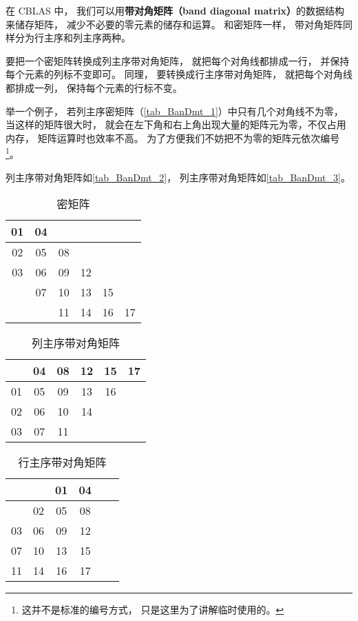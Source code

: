 

在 CBLAS 中， 我们可以用\textbf{带对角矩阵（band diagonal matrix）}的数据结构来储存矩阵， 减少不必要的零元素的储存和运算。 和密矩阵一样， 带对角矩阵同样分为行主序和列主序两种。

要把一个密矩阵转换成列主序带对角矩阵， 就把每个对角线都排成一行， 并保持每个元素的列标不变即可。 同理， 要转换成行主序带对角矩阵， 就把每个对角线都排成一列， 保持每个元素的行标不变。

举一个例子， 若列主序密矩阵（\autoref{tab_BanDmt_1}）中只有几个对角线不为零， 当这样的矩阵很大时， 就会在左下角和右上角出现大量的矩阵元为零，不仅占用内存， 矩阵运算时也效率不高。 为了方便我们不妨把不为零的矩阵元依次编号\footnote{这并不是标准的编号方式， 只是这里为了讲解临时使用的。}。

列主序带对角矩阵如\autoref{tab_BanDmt_2}， 列主序带对角矩阵如\autoref{tab_BanDmt_3}。

\begin{table}[ht]
\centering
\caption{密矩阵}\label{tab_BanDmt_1}
\begin{tabular}{|c|c|c|c|c|c|}
\hline
01  & 04  &    &    &    &   \\
\hline
02  & 05  & 08  &    &    &   \\
\hline
03  & 06  & 09  & 12  &    &   \\
\hline
   & 07  & 10 &  13  & 15  &   \\
\hline
   &    & 11 &  14  & 16  & 17 \\
\hline
\end{tabular}
\end{table}

\begin{table}[ht]
\centering
\caption{列主序带对角矩阵}\label{tab_BanDmt_2}
\begin{tabular}{|c|c|c|c|c|c|}
\hline
   & 04  & 08  & 12 &  15 &  17 \\
\hline
01  & 05  & 09  & 13 &  16 &    \\
\hline
02  & 06  & 10 & 14 &     &    \\
\hline
03  & 07  & 11 &    &     &    \\
\hline
\end{tabular}
\end{table}

\begin{table}[ht]
\centering
\caption{行主序带对角矩阵}\label{tab_BanDmt_3}
\begin{tabular}{|c|c|c|c|c|c|}
\hline
   &     &  01  &  04 \\
\hline
   &  02  &  05  &  08 \\
\hline
03  &  06  &  09  &  12 \\
\hline
07  &  10 &  13 &  15 \\
\hline
11 &  14 &  16 &  17 \\
\hline
\end{tabular}
\end{table}

